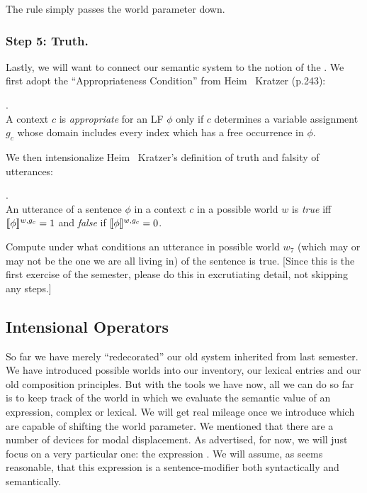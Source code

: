 The rule simply passes the world parameter down.

\subsubsection{Step 5: Truth.} \label{sec:truth}

Lastly, we will want to connect our semantic system to the notion of
the . We first adopt the ``Appropriateness
Condition'' from Heim \amp\ Kratzer (p.243):

\ex. \\
A context $c$ is \emph{appropriate} for an LF $\phi$ only if $c$
determines a variable assignment $g_c$ whose domain includes every
index which has a free occurrence in $\phi$.

We then intensionalize Heim \amp\ Kratzer's definition of truth and
falsity of utterances:

\ex. \\
An utterance of a sentence $\phi$ in a context $c$ in a possible world $w$ is \emph{true} iff $\llbracket \phi \rrbracket^{w,g_c} = 1$ and \emph{false} if $\llbracket \phi \rrbracket^{w,g_c} = 0$.

\begin{exercise}
  Compute under what conditions an utterance in possible world $w_7$
  (which may or may not be the one we are all living in) of the
  sentence 
  is true. [Since this is the first exercise of the semester, please
  do this in excrutiating detail, not skipping any steps.] \eex
\end{exercise}

\subsection{Intensional Operators} \label{sec:intens-oper}

So far we have merely ``redecorated'' our old system inherited from
last semester. We have introduced possible worlds into our inventory,
our lexical entries and our old composition principles. But with the
tools we have now, all we can do so far is to keep track of the world
in which we evaluate the semantic value of an expression, complex or
lexical. We will get real mileage once we introduce  which are capable of shifting the world parameter. We
mentioned that there are a number of devices for modal displacement.
As advertised, for now, we will just focus on a very particular one:
the expression . We will
assume, as seems reasonable, that this expression is a
sentence-modifier both syntactically and semantically.

